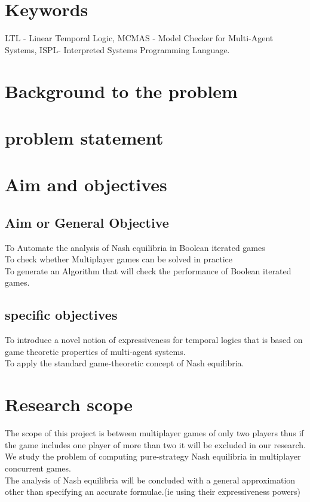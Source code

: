 \documentclass[14pt, a4paper]{article}
\begin{document}
				

			\section{Keywords}
			
				LTL - Linear Temporal Logic, MCMAS - Model Checker for Multi-Agent Systems, ISPL- Interpreted Systems Programming Language.

				

			\section{Background to the problem}

				
			\section{problem statement}
			
			
			\section{Aim and objectives}
			
				\subsection{Aim or General Objective}
					To Automate the analysis of Nash equilibria in Boolean iterated games\\
		To check whether Multiplayer games can be solved in practice\\
		To generate an Algorithm that will check the performance of Boolean iterated games.\\
		
				
				\subsection{specific objectives}
						To introduce a novel notion of expressiveness for temporal logics that is based on game theoretic properties of multi-agent systems.\\
		To apply the standard game-theoretic concept of Nash equilibria.\\

			
			\section{Research scope}
			
				The scope of this project is between multiplayer games of only two players thus if the game includes one player of more than two it will be excluded in our research.\\
	We study the problem of computing pure-strategy Nash equilibria in multiplayer concurrent games.\\
	The analysis of Nash equilibria will be concluded with a general approximation other than specifying an accurate formulae.(ie using their expressiveness powers)\\
\end{document}
